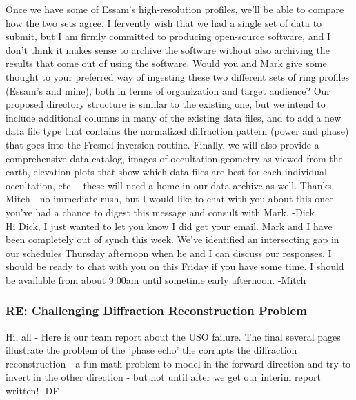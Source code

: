\documentclass[crop=false,class=book]{standalone}
\begin{document}
Once we have some of Essam's high-resolution profiles, we'll be able to compare how the two sets agree. I fervently wish that we had a single set of data to submit, but I am firmly committed to producing open-source software, and I don't think it makes sense to archive the software without also archiving the results that come out of using the software. Would you and Mark give some thought to your preferred way of ingesting these two different sets of ring profiles (Essam's and mine), both in terms of organization and target audience? Our proposed directory structure is similar to the existing one, but we intend to include additional columns in many of the existing data files, and to add a new data file type that contains the normalized diffraction pattern (power and phase) that goes into the Fresnel inversion routine. Finally, we will also provide a comprehensive data catalog, images of occultation geometry as viewed from the earth, elevation plots that show which data files are best for each individual occultation, etc. - these will need a home in our data archive as well. Thanks, Mitch - no immediate rush, but I would like to chat with you about this once you've had a chance to digest this message and consult with Mark. -Dick\\
Hi Dick, I just wanted to let you know I did get your email. Mark and I have been completely out of synch this week. We’ve identified an intersecting gap in our schedules Thursday afternoon when he and I can discuss our responses. I should be ready to chat with you on this Friday if you have some time. I should be available from about 9:00am until sometime early afternoon. -Mitch
\subsubsection{\footnotesize RE: Challenging Diffraction Reconstruction Problem}
Hi, all - Here is our team report about the USO failure. The final several pages illustrate the problem of the 'phase echo' the corrupts the diffraction reconstruction - a fun math problem to model in the forward direction and try to invert in the other direction - but not until after we get our interim report written! -DF
\end{document}
